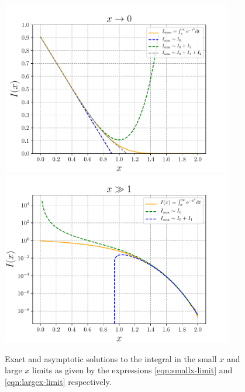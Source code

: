 \begin{figure}[!h]
	\centering
	\includegraphics[width=0.9\textwidth]{./plots/pdf/strogatz-wk03-smallx.pdf}
	\includegraphics[width=0.9\textwidth]{./plots/pdf/strogatz-wk03-largex.pdf}
	\caption{Exact and asymptotic solutions to the integral in the small $x$ and large $x$ limits as given by the expressions \ref{eqn:smallx-limit} and \ref{eqn:largex-limit} respectively. }
	\label{fig:strogatz-wk03}
\end{figure}
